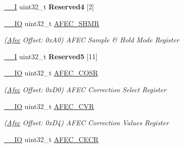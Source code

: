 \begin{DoxyCompactItemize}
\mbox{\label{structAfec_a604c7f271a5212fd746d06553a773361}} 
\mbox{\hyperlink{core__cm7_8h_af63697ed9952cc71e1225efe205f6cd3}{\+\_\+\+\_\+I}} uint32\+\_\+t {\bfseries Reserved4} \mbox{[}2\mbox{]}
\item 
\mbox{\label{structAfec_ac9467752a3207b64652eeacef9a2ca4a}} 
\mbox{\hyperlink{core__cm7_8h_aec43007d9998a0a0e01faede4133d6be}{\+\_\+\+\_\+\+IO}} uint32\+\_\+t \mbox{\hyperlink{structAfec_ac9467752a3207b64652eeacef9a2ca4a}{A\+F\+E\+C\+\_\+\+S\+H\+MR}}
\begin{DoxyCompactList}\small\item\em (\mbox{\hyperlink{structAfec}{Afec}} Offset\+: 0x\+A0) A\+F\+EC Sample \& Hold Mode Register \end{DoxyCompactList}\item 
\mbox{\label{structAfec_a48c243a854262674e08ba68c2f2403fd}} 
\mbox{\hyperlink{core__cm7_8h_af63697ed9952cc71e1225efe205f6cd3}{\+\_\+\+\_\+I}} uint32\+\_\+t {\bfseries Reserved5} \mbox{[}11\mbox{]}
\item 
\mbox{\label{structAfec_a6328d8b21fc8150a839bd8350f87dd36}} 
\mbox{\hyperlink{core__cm7_8h_aec43007d9998a0a0e01faede4133d6be}{\+\_\+\+\_\+\+IO}} uint32\+\_\+t \mbox{\hyperlink{structAfec_a6328d8b21fc8150a839bd8350f87dd36}{A\+F\+E\+C\+\_\+\+C\+O\+SR}}
\begin{DoxyCompactList}\small\item\em (\mbox{\hyperlink{structAfec}{Afec}} Offset\+: 0x\+D0) A\+F\+EC Correction Select Register \end{DoxyCompactList}\item 
\mbox{\label{structAfec_adcd1f9289fd9eb9510b929515ef76d05}} 
\mbox{\hyperlink{core__cm7_8h_aec43007d9998a0a0e01faede4133d6be}{\+\_\+\+\_\+\+IO}} uint32\+\_\+t \mbox{\hyperlink{structAfec_adcd1f9289fd9eb9510b929515ef76d05}{A\+F\+E\+C\+\_\+\+C\+VR}}
\begin{DoxyCompactList}\small\item\em (\mbox{\hyperlink{structAfec}{Afec}} Offset\+: 0x\+D4) A\+F\+EC Correction Values Register \end{DoxyCompactList}\item 
\mbox{\label{structAfec_a1e860021a4b2bd1e05d1a9dabb4bcfd6}} 
\mbox{\hyperlink{core__cm7_8h_aec43007d9998a0a0e01faede4133d6be}{\+\_\+\+\_\+\+IO}} uint32\+\_\+t \mbox{\hyperlink{structAfec_a1e860021a4b2bd1e05d1a9dabb4bcfd6}{A\+F\+E\+C\+\_\+\+C\+E\+CR}}

\end{DoxyCompactItemize}
